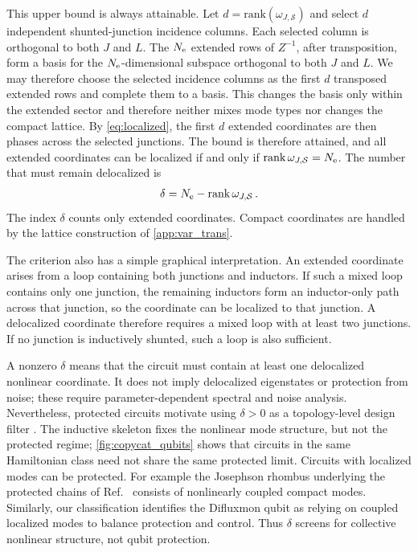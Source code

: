 This upper bound is always attainable. Let $d=\textrm{rank}(\omega_{J,\mathcal S})$ and select $d$ independent shunted-junction incidence columns. Each selected column is orthogonal to both $J$ and $L$. The $N_{\rm e}$ extended rows of $Z^{-1}$, after transposition, form a basis for the $N_{\rm e}$-dimensional subspace orthogonal to both $J$ and $L$. We may therefore choose the selected incidence columns as the first $d$ transposed extended rows and complete them to a basis. This changes the basis only within the extended sector and therefore neither mixes mode types nor changes the compact lattice. By \cref{eq:localized}, the first $d$ extended coordinates are then phases across the selected junctions. The bound is therefore attained, and all extended coordinates can be localized if and only if $\textrm{rank}\,\omega_{J,\mathcal{S}}=N_{\rm e}$. The number that must remain delocalized is
\begin{align}
    \delta=N_{\rm e}-\textrm{rank}\,\omega_{J,\mathcal{S}} \, .
    \label{eq:skel_delta}
\end{align}
The index $\delta$ counts only extended coordinates. Compact coordinates are handled by the lattice construction of \cref{app:var_trans}.

The criterion also has a simple graphical interpretation. An extended coordinate arises from a loop containing both junctions and inductors. If such a mixed loop contains only one junction, the remaining inductors form an inductor-only path across that junction, so the coordinate can be localized to that junction. 
A delocalized coordinate therefore requires a mixed loop with at least two junctions. If no junction is inductively shunted, such a loop is also sufficient.

A nonzero $\delta$ means that the circuit must contain at least one delocalized nonlinear coordinate. It does not imply delocalized eigenstates or protection from noise; these require parameter-dependent spectral and noise analysis. Nevertheless, protected circuits motivate using $\delta>0$ as a topology-level design filter \cite{gyenisMovingTransmonNoiseProtected2021b,kalashnikov_bifluxon_2020}. The inductive skeleton fixes the nonlinear mode structure, but not the protected regime; \cref{fig:copycat_qubits} shows that circuits in the same Hamiltonian class need not share the same protected limit.
Circuits with localized modes can be protected. For example the Josephson rhombus underlying the protected chains of Ref.~\cite{Bell2014} consists of nonlinearly coupled compact modes. Similarly, our classification identifies the Difluxmon qubit \cite{garcia-azorin_2024} as relying on coupled localized modes to balance protection and control.
Thus $\delta$ screens for collective nonlinear structure, not qubit protection.



